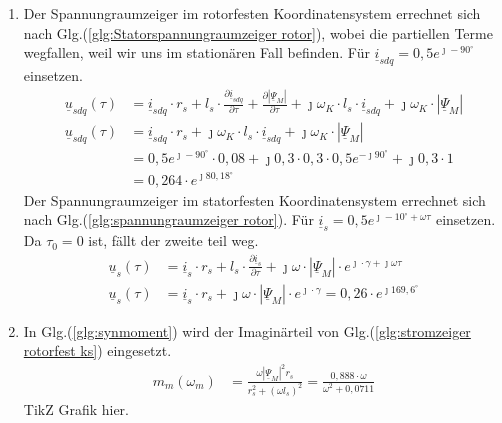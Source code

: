 \begin{solution}
\begin{enumerate}
\item Der Spannungraumzeiger im rotorfesten Koordinatensystem errechnet sich nach Glg.(\ref{glg:Statorspannungraumzeiger rotor}), wobei die partiellen Terme wegfallen, weil wir uns im stationären Fall befinden. Für $\underline{i}_{sdq}= 0,5 e^{\jmath -90^\circ}$ einsetzen.
\begin{align}
\underline{u}_{sdq}(\tau) &= \underline{i}_{sdq} \cdot r_s + l_s \cdot \frac{\partial \underline{i}_{sdq}}{\partial \tau} + \frac{\partial |\underline{\Psi}_M|}{\partial \tau} + \jmath \omega_K \cdot l_s \cdot \underline{i}_{sdq} + \jmath \omega_K \cdot |\underline{\Psi}_M|\\
\underline{u}_{sdq}(\tau) &= \underline{i}_{sdq} \cdot r_s + \jmath \omega_K \cdot l_s \cdot \underline{i}_{sdq} + \jmath \omega_K \cdot |\underline{\Psi}_M|\\
&= 0,5 e^{\jmath -90^\circ} \cdot 0,08 + \jmath 0,3 \cdot 0,3 \cdot 0,5 e^{-\jmath 90^\circ}+\jmath 0,3 \cdot 1\\
&=0,264 \cdot e^{\jmath 80,18^\circ}
\end{align}
Der Spannungraumzeiger im statorfesten Koordinatensystem errechnet sich nach Glg.(\ref{glg:spannungraumzeiger rotor}). Für $\underline{i}_{s}= 0,5 e^{\jmath -10^\circ+\omega \tau}$ einsetzen. Da $\tau_0 = 0$ ist, fällt der zweite teil weg.
\begin{align}
\underline{u}_s(\tau) &= \underline{i}_s \cdot r_s + l_s \cdot \frac{\partial \underline{i}_s}{\partial \tau} + \jmath\omega \cdot|\underline{\Psi}_M | \cdot e^{\jmath \cdot \gamma + \jmath \omega \tau}\\
\underline{u}_s(\tau) &= \underline{i}_s \cdot r_s + \jmath\omega \cdot|\underline{\Psi}_M | \cdot e^{\jmath \cdot \gamma}=0,26\cdot e^{\jmath 169,6^\circ}
\end{align}
\item In Glg.(\ref{glg:synmoment}) wird der Imaginärteil von Glg.(\ref{glg:stromzeiger rotorfest ks}) eingesetzt.
\begin{align}
m_m(\omega_m) &= \frac{\omega |\underline{\Psi}_M|^2 r_s}{r_s^2 + (\omega l_s)^2}=\frac{0,888 \cdot \omega}{\omega^2 + 0,0711}
\end{align}
TikZ Grafik hier.
\end{enumerate}
\end{solution}